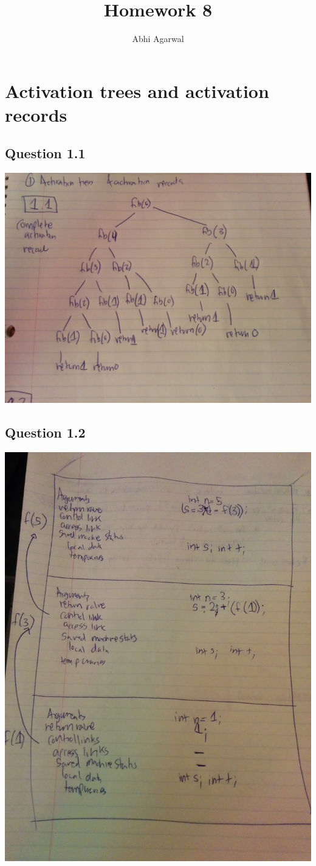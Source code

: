 \documentclass[11pt, oneside]{article}   	%
\title{Homework 8}
\author{Abhi Agarwal}
\date{}
\begin{document}
\maketitle

\section{Activation trees and activation records}

\subsection{Question 1.1}
\includegraphics[scale=0.15]{IMG_20141031_203503.jpg}

\subsection{Question 1.2}

\includegraphics[scale=0.20]{IMG_20141105_001043.jpg}
\end{document}

